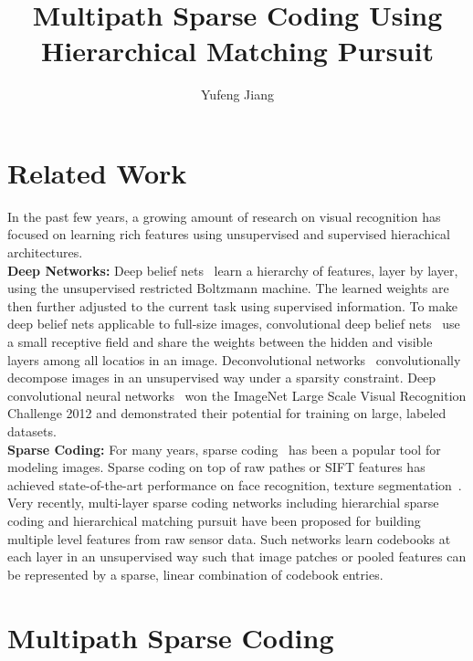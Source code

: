 \documentclass[10pt,twocolumn,letterpaper]{article}
\begin{document}
\title{Multipath Sparse Coding Using Hierarchical Matching Pursuit}
\author{Yufeng Jiang}
\maketitle

\section{Related Work}

In the past few years, a growing amount of research on visual recognition has focused on learning rich features using unsupervised and supervised hierachical architectures. \\
{\bf Deep Networks:} Deep belief nets~\cite{A} learn a hierarchy of features, layer by layer, using the unsupervised restricted Boltzmann machine. The learned weights are then further adjusted to the current task using supervised information. To make deep belief nets applicable to full-size images, convolutional deep belief nets~\cite{Convolutional} use a small receptive field and share the weights between the hidden and visible layers among all locatios in an image. Deconvolutional networks~\cite{Adaptive} convolutionally decompose images in an unsupervised way under a sparsity constraint. Deep convolutional neural networks~\cite{classification} won the ImageNet Large Scale Visual Recognition Challenge 2012 and demonstrated their potential for training on large, labeled datasets.\\
{\bf Sparse Coding:} For many years, sparse coding~\cite{Emergence} has been a popular tool for modeling images. Sparse coding on top of raw pathes or SIFT features has achieved state-of-the-art performance on face recognition, texture segmentation~\cite{Discriminative}. Very recently, multi-layer sparse coding networks including hierarchial sparse coding and hierarchical matching pursuit have been proposed for building multiple level features from raw sensor data. Such networks learn codebooks at each layer in an unsupervised way such that image patches or pooled features can be represented by a sparse, linear combination of codebook entries. 

\section{Multipath Sparse Coding}
\end{document}
